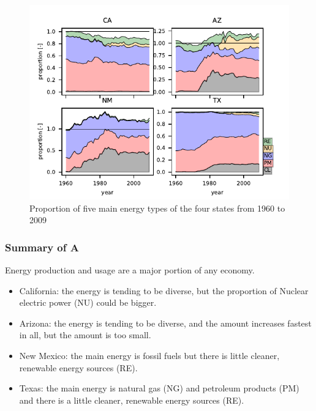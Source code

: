 \begin{figure}[H] 
    \centering 
    \includegraphics[width=0.8\linewidth]{fig/proportion.pdf}
    \caption{Proportion of five main energy types of the four states from 1960 to 2009}
    \label{fig: prop}
\end{figure}

\subsubsection{Summary of A}
Energy production and usage are a major portion of any economy. 
\begin{itemize}
    \item California: the energy is tending to be diverse, but the proportion of Nuclear electric power (NU) could be bigger.
    \item Arizona: the energy is tending to be diverse, and the amount increases fastest in all, but the amount is too small.
    \item New Mexico: the main energy is fossil fuels but there is little cleaner, renewable energy sources (RE).
    \item Texas: the main energy is natural gas (NG) and petroleum products (PM) and there is a little cleaner, renewable energy sources (RE).
\end{itemize}